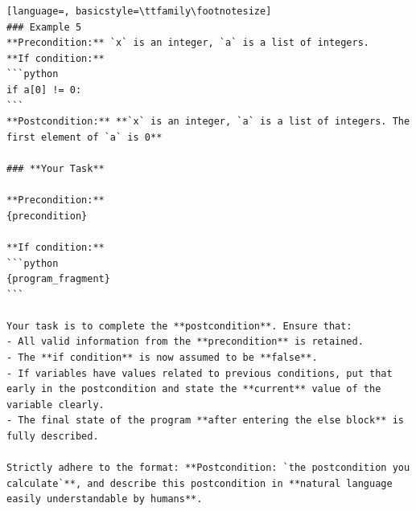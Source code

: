 \documentclass[sigconf]{acmart}
\begin{document}
\begin{tcolorbox}[ colback=gray!10, colframe=black, arc=5pt]
\begin{lstlisting}[language=, basicstyle=\ttfamily\footnotesize]
### Example 5  
**Precondition:** `x` is an integer, `a` is a list of integers.  
**If condition:**  
```python
if a[0] != 0:
```
**Postcondition:** **`x` is an integer, `a` is a list of integers. The first element of `a` is 0**

### **Your Task**

**Precondition:**  
{precondition}

**If condition:**  
```python
{program_fragment}
```

Your task is to complete the **postcondition**. Ensure that:
- All valid information from the **precondition** is retained.
- The **if condition** is now assumed to be **false**.
- If variables have values related to previous conditions, put that early in the postcondition and state the **current** value of the variable clearly.
- The final state of the program **after entering the else block** is fully described.

Strictly adhere to the format: **Postcondition: `the postcondition you calculate`**, and describe this postcondition in **natural language easily understandable by humans**.

\end{lstlisting}
\end{tcolorbox}
\end{document}
